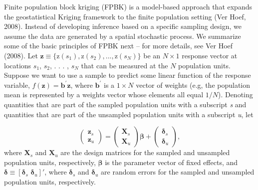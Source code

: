 \documentclass[]{elsarticle} %
\begin{document}
Finite population block kriging (FPBK) is a model-based approach that
expands the geostatistical Kriging framework to the finite population
setting (Ver Hoef, 2008). Instead of developing inference based on a
specific sampling design, we assume the data are generated by a spatial
stochastic process. We summarize some of the basic principles of FPBK
next -- for more details, see Ver Hoef (2008). Let
\({\mathbf{z} \equiv \{\text{z}(s_1), \text{z}(s_2), . . . , \text{z}(s_N) \}}\)
be an \(N \times 1\) response vector at locations \(s_1\), \(s_2\), . .
. , \(s_N\) that can be measured at the \(N\) population units. Suppose
we want to use a sample to predict some linear function of the response
variable, \(f(\mathbf{z}) = \mathbf{b}^\prime \mathbf{z}\), where
\(\mathbf{b}^\prime\) is a \(1 \times N\) vector of weights (e.g, the
population mean is represented by a weights vector whose elements all
equal \(1 / N\)). Denoting quantities that are part of the sampled
population units with a subscript \emph{s} and quantities that are part
of the unsampled population units with a subscript \emph{u}, let

\begin{equation}
\begin{pmatrix} \label{equation:Zmarginal}
    \mathbf{z}_s      \\
    \mathbf{z}_u
\end{pmatrix}
=
\begin{pmatrix}
  \mathbf{X}_s    \\
  \mathbf{X}_u
\end{pmatrix}
\bm{\beta} +
\begin{pmatrix}
\bm{\delta}_s    \\
\bm{\delta}_u
\end{pmatrix},
\end{equation} where \(\mathbf{X}_s\) and \(\mathbf{X}_u\) are the
design matrices for the sampled and unsampled population units,
respectively, \(\bm{\beta}\) is the parameter vector of fixed effects,
and \(\bm{\delta} \equiv [\bm{\delta}_s \,\, \bm{\delta}_u]'\), where
\(\bm{\delta}_s\) and \(\bm{\delta}_u\) are random errors for the
sampled and unsampled population units, respectively.
\end{document}
